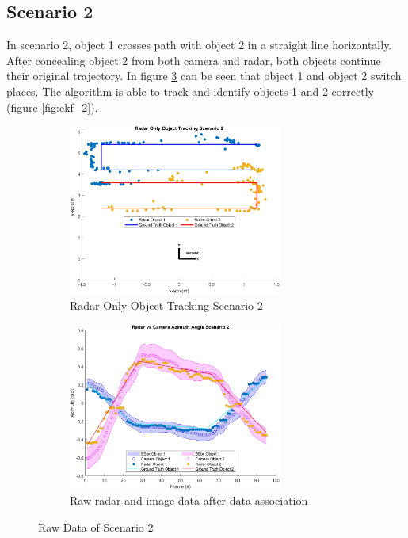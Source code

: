 \subsection{Scenario 2}\label{sec:3-exp_result2}
In scenario 2, object 1 crosses path with object 2 in a straight line horizontally.
After concealing object 2 from both camera and radar, both objects continue their original trajectory.
In figure \ref*{fig:raw_2} can be seen that object 1 and object 2 switch places.
The algorithm is able to track and identify objects 1 and 2 correctly (figure \ref*{fig:ekf_2}).
\begin{figure}[!htb]
    \hspace{0.1\textwidth}
    \begin{subfigure}[b]{0.3\textwidth}%
        \includegraphics[width=7cm]{Figures/matlab/Radar Only Object Tracking Scenario 2.png}
        \caption{Radar Only Object Tracking Scenario 2}
        \label{subfig:radar_2}
    \end{subfigure}
    \hspace{0.1\textwidth}
    \begin{subfigure}[b]{0.3\textwidth}%
        \includegraphics[width=7cm]{Figures/matlab/Radar vs Camera Azimuth Angle Scenario 2.png}
        \caption{Raw radar and image data after data association}
        \label{subfig:raw_fusion_2}
    \end{subfigure}

    \caption{Raw Data of Scenario 2}
    \label{fig:raw_2}
\end{figure}
